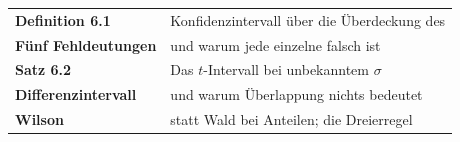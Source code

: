 \begin{merksatz}
\begin{center}
\renewcommand{\arraystretch}{1.5}
\begin{tabular}{@{}P{3.2cm}P{5.4cm}@{}}
\toprule
\textbf{Definition 6.1} & Konfidenzintervall über die Überdeckung des \\
\textbf{Fünf Fehldeutungen} & und warum jede einzelne falsch ist\\
\textbf{Satz 6.2} & Das $t$-Intervall bei unbekanntem $\sigma$\\
\textbf{Differenz\-intervall} & und warum Überlappung nichts bedeutet\\
\textbf{Wilson} & statt Wald bei Anteilen; die Dreierregel\\
\bottomrule
\end{tabular}
\end{center}

\begin{center}
\begin{minipage}{0.88\textwidth}
\end{minipage}
\end{center}
\end{merksatz}
